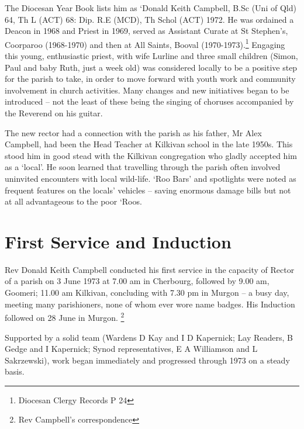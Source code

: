 The Diocesan Year Book lists him as `Donald Keith Campbell, B.Sc (Uni of Qld) 64, Th L (ACT) 68: Dip. R.E (MCD), Th Schol (ACT) 1972. He was ordained a Deacon in 1968 and Priest in 1969, served as Assistant Curate at St Stephen's, Coorparoo (1968-1970) and then at All Saints, Booval (1970-1973).\footnote{Diocesan Clergy Records P 24} Engaging this young, enthusiastic priest, with wife Lurline and three small children (Simon, Paul and baby Ruth, just a week old) was considered locally to be a positive step for the parish to take, in order to move forward with youth work and community involvement in church activities. Many changes and new initiatives began to be introduced -- not the least of these being the singing of choruses accompanied by the Reverend on his guitar.


The new rector had a connection with the parish as his father, Mr Alex Campbell, had been the Head Teacher at Kilkivan school in the late 1950s. This stood him in good stead with the Kilkivan congregation who gladly accepted him as a `local'. He soon learned that travelling through the parish often involved uninvited encounters with local wild-life. `Roo Bars' and spotlights were noted as frequent features on the locals' vehicles -- saving enormous damage bills but not at all advantageous to the poor `Roos.



\section{First Service and Induction}



Rev Donald Keith Campbell conducted his first service in the capacity of Rector of a parish on 3 June 1973 at 7.00 am in Cherbourg, followed by 9.00 am, Goomeri; 11.00 am Kilkivan, concluding with 7.30 pm in Murgon -- a busy day, meeting many parishioners, none of whom ever wore name badges. His Induction followed on 28 June in Murgon. \footnote{Rev Campbell's correspondence}


Supported by a solid team (Wardens D Kay and I D Kapernick; Lay Readers, B Gedge and I Kapernick; Synod representatives, E A Williamson and L Sakrzewski), work began immediately and progressed through 1973 on a steady basis.



